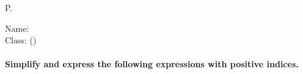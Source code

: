 \documentclass[12pt, a4paper, addpoints] {exam}
\begin{document}
\setlength\dottedlinefillheight{0.79cm}
\footer{}
       {P.\thepage}{}
\headrule 
\footrule


		{}
		{\textsf{Name:} \underline{\hspace{2.85cm}}\\
                  \hfill \textsf{Class:} \underline{\hspace{1.8cm}}(\qquad)}
\pgfmathsetseed{\year} %
\paragraph*{Simplify and express the following expressions with positive indices.}
\end{document}
